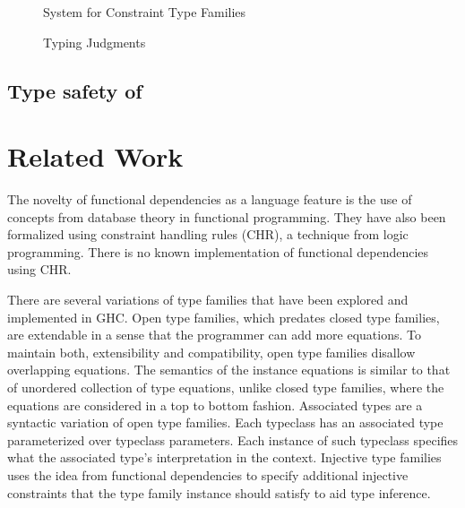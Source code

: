 \documentclass[format=sigplan,manuscript,review,screen,nonacm,margin=1in]{acmart}
\begin{document}
\begin{figure}[ht]
  \caption[Constraint Type Families System]{System for Constraint Type Families}
  \label{fig:syntax-tf-constrained}
\end{figure}

\begin{figure}[ht]
  \centering
  
  \caption[Typing Judgments for \QLTF]{Typing Judgments \QLTF{}}
  \label{fig:syntax-tf-constrained}
\end{figure}

\subsection{Type safety of \QLTF{}}\label{subsec:tf-constrained-safety} 

\newpage
\section{Related Work}\label{sec:related-work}
The novelty of functional dependencies as a language feature is the use of concepts from database theory
in functional programming\cite{codd_realtional_1970, amstrong_dependency_1974}.
They have also been formalized using constraint handling rules (CHR),
a technique from logic programming\cite{sulzmann_understanding_2007}. There is no known
implementation of functional dependencies using CHR.

There are several variations of type families that have been explored and implemented in GHC.
Open type families\cite{schrijvers_type_2008}, which predates closed type families,
are extendable in a sense that the programmer can add more equations.
To maintain both, extensibility and compatibility, open type families disallow overlapping equations.
The semantics of the instance equations is similar to that of unordered collection of type equations, unlike
closed type families, where the equations are considered in a top to bottom fashion.
Associated types\cite{chakravarty_associated_2005} are a syntactic variation of open type families.
Each typeclass has an associated type parameterized over typeclass parameters. Each instance of such typeclass
specifies what the associated type's interpretation in the context. Injective type families\cite{stolarek_injective_2015}
uses the idea from functional dependencies to specify additional injective constraints that the type family instance
should satisfy to aid type inference.
\end{document}
